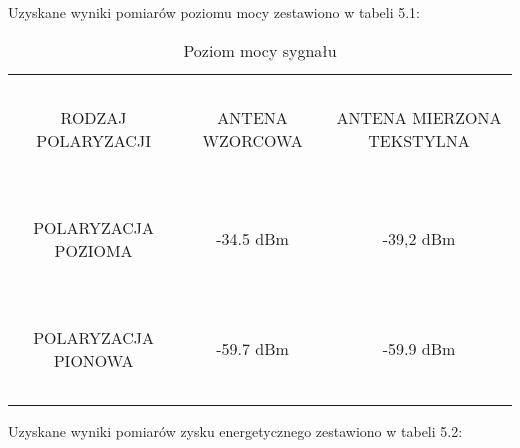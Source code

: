 \noindent
\newline Uzyskane wyniki pomiarów poziomu mocy zestawiono w tabeli 5.1:


\begin{table}[h!]
\begin{center}
    \begin{tabular}{|c|c|c|}
    \hline
    ~                     & ~               & ~                         \\
     RODZAJ POLARYZACJI    & ANTENA WZORCOWA & ANTENA MIERZONA TEKSTYLNA \\
    ~                     & ~               & ~                         \\ \hline
    ~                     & ~               & ~                         \\
     POLARYZACJA POZIOMA  & -34.5 dBm       & -39,2 dBm                 \\
    ~                     & ~               & ~                         \\ \hline
    ~                     & ~               & ~                         \\
     POLARYZACJA PIONOWA  & -59.7 dBm       & -59.9 dBm                 \\
    ~                     & ~               & ~                         \\ \hline
    \end{tabular}
    \caption{Poziom mocy sygnału}
\end{center}
\end{table}


\noindent
\newline Uzyskane wyniki pomiarów zysku energetycznego zestawiono w tabeli 5.2:


